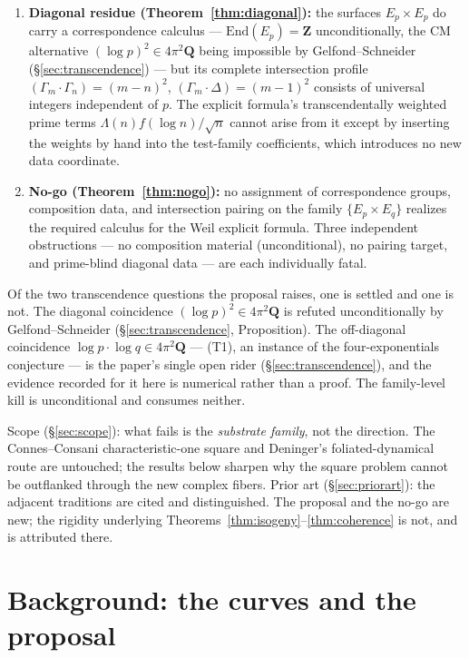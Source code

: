 \documentclass[11pt]{article}
\theoremstyle{definition}
\theoremstyle{remark}
\newcommand{\Z}{\mathbf{Z}}
\newcommand{\Q}{\mathbf{Q}}
\newcommand{\End}{\mathrm{End}}
\begin{document}
\begin{enumerate}
the zero group.
\item \textbf{Diagonal residue (Theorem~\ref{thm:diagonal}):} the surfaces
$E_p \times E_p$ do carry a correspondence calculus ---
$\End(E_p) = \Z$ unconditionally, the CM alternative
$(\log p)^2 \in 4\pi^2\Q$ being impossible by Gelfond--Schneider
(\S\ref{sec:transcendence}) --- but its complete intersection profile
$(\Gamma_m\cdot\Gamma_n) = (m-n)^2$, $(\Gamma_m\cdot\Delta) = (m-1)^2$
consists of universal integers independent of $p$. The explicit
formula's transcendentally weighted prime terms $\Lambda(n) f(\log n)/\sqrt{n}$
cannot arise from it except by inserting the weights by hand into the
test-family coefficients, which introduces no new data coordinate.
\item \textbf{No-go (Theorem~\ref{thm:nogo}):} no assignment of
correspondence groups, composition data, and intersection pairing on the
family $\{E_p \times E_q\}$ realizes the required calculus for the Weil
explicit formula. Three independent obstructions --- no composition material
(unconditional), no pairing target, and prime-blind diagonal data --- are
each individually fatal.
\end{enumerate}

Of the two transcendence questions the proposal raises, one is settled
and one is not. The diagonal coincidence $(\log p)^2 \in 4\pi^2\Q$ is refuted
unconditionally by Gelfond--Schneider (\S\ref{sec:transcendence},
Proposition). The off-diagonal coincidence
$\log p\cdot\log q \in 4\pi^2\Q$ --- (T1), an instance of the
four-exponentials conjecture --- is the paper's single open rider
(\S\ref{sec:transcendence}), and the evidence recorded for it here is
numerical rather than a proof. The family-level kill is unconditional and
consumes neither.

Scope (\S\ref{sec:scope}): what fails is the \emph{substrate family}, not the
direction. The Connes--Consani characteristic-one square and Deninger's
foliated-dynamical route are untouched; the results below sharpen why the
square problem cannot be outflanked through the new complex fibers. Prior art
(\S\ref{sec:priorart}): the adjacent traditions are cited and distinguished.
The proposal and the no-go are new; the rigidity underlying
Theorems~\ref{thm:isogeny}--\ref{thm:coherence} is not, and is attributed
there.

\section{Background: the curves and the proposal}
\label{sec:background}
\end{document}
